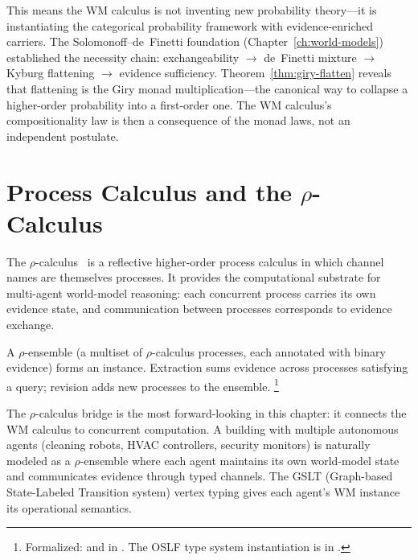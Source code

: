 \documentclass[11pt,openany]{report}
\begin{document}
\noindent
This means the WM calculus is not inventing new probability
theory---it is instantiating the categorical probability framework
with evidence-enriched carriers.  The Solomonoff--de~Finetti
foundation (Chapter~\ref{ch:world-models}) established the
necessity chain: exchangeability $\to$ de~Finetti mixture $\to$
Kyburg flattening $\to$ evidence sufficiency.
Theorem~\ref{thm:giry-flatten} reveals that flattening is the
Giry monad multiplication---the canonical way to collapse a
higher-order probability into a first-order one.  The WM
calculus's compositionality law is then a consequence of the
monad laws, not an independent postulate.


\section{Process Calculus and the \texorpdfstring{$\rho$}{rho}-Calculus}
\label{sec:bridge-rho}

The $\rho$-calculus~\cite{meredith2026ccc} is a reflective
higher-order process calculus in which channel names are themselves
processes.  It provides the computational substrate for
multi-agent world-model reasoning: each concurrent process carries
its own evidence state, and communication between processes
corresponds to evidence exchange.

\begin{theorem}
\label{thm:rho-wm}
A $\rho$-ensemble (a multiset of $\rho$-calculus processes,
each annotated with binary evidence) forms an
 instance.  Extraction sums evidence
across processes satisfying a query; revision adds new processes
to the ensemble.%
\footnote{Formalized:
 and 
in .
The OSLF type system instantiation is in
.}
\end{theorem}

\noindent
The $\rho$-calculus bridge is the most forward-looking in this
chapter: it connects the WM calculus to concurrent computation.
A building with multiple autonomous agents (cleaning robots,
HVAC controllers, security monitors) is naturally modeled as a
$\rho$-ensemble where each agent maintains its own world-model
state and communicates evidence through typed channels.  The
GSLT (Graph-based State-Labeled Transition system) vertex typing
gives each agent's WM instance its operational semantics.
\end{document}
